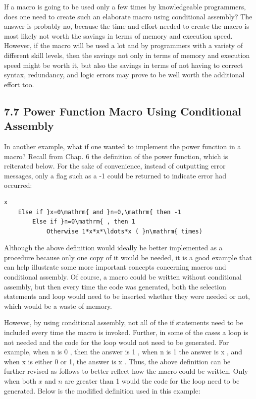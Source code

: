 \documentclass[10pt]{article}
\begin{document}
If a macro is going to be used only a few times by knowledgeable programmers, does one need to create such an elaborate macro using conditional assembly? The answer is probably no, because the time and effort needed to create the macro is most likely not worth the savings in terms of memory and execution speed. However, if the macro will be used a lot and by programmers with a variety of different skill levels, then the savings not only in terms of memory and execution speed might be worth it, but also the savings in terms of not having to correct syntax, redundancy, and logic errors may prove to be well worth the additional effort too.

\subsection*{7.7 Power Function Macro Using Conditional Assembly}
In another example, what if one wanted to implement the power function in a macro? Recall from Chap. 6 the definition of the power function, which is reiterated below. For the sake of convenience, instead of outputting error messages, only a flag such as a -1 could be returned to indicate error had occurred:

\begin{verbatim}
x
    Else if }x=0\mathrm{ and }n=0,\mathrm{ then -1
        Else if }n=0\mathrm{ , then 1
            Otherwise 1*x*x*\ldots*x ( }n\mathrm{ times)
\end{verbatim}

Although the above definition would ideally be better implemented as a procedure because only one copy of it would be needed, it is a good example that can help illustrate some more important concepts concerning macros and conditional assembly. Of course, a macro could be written without conditional assembly, but then every time the code was generated, both the selection statements and loop would need to be inserted whether they were needed or not, which would be a waste of memory.

However, by using conditional assembly, not all of the if statements need to be included every time the macro is invoked. Further, in some of the cases a loop is not needed and the code for the loop would not need to be generated. For example, when n is 0 , then the answer is 1 , when n is 1 the answer is x , and when x is either 0 or 1, the answer is x . Thus, the above definition can be further revised as follows to better reflect how the macro could be written. Only when both $x$ and $n$ are greater than 1 would the code for the loop need to be generated. Below is the modified definition used in this example:
\end{document}
